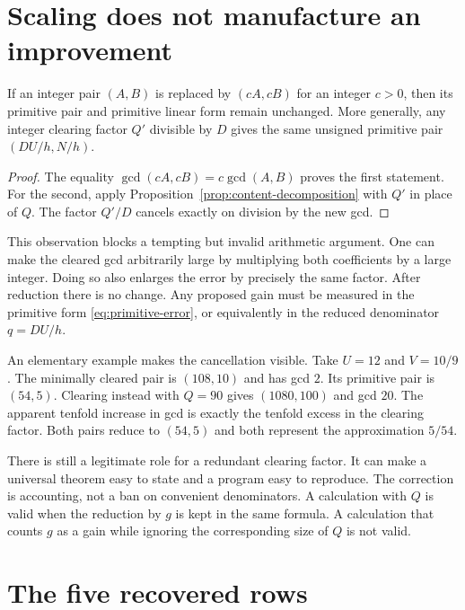 \section{Scaling does not manufacture an improvement}

\begin{proposition}
\label{prop:scale-invariance}
If an integer pair $(A,B)$ is replaced by $(cA,cB)$ for an integer $c>0$, then its primitive pair and primitive linear form remain unchanged. More generally, any integer clearing factor $Q'$ divisible by $D$ gives the same unsigned primitive pair $(DU/h,N/h)$.
\end{proposition}

\begin{proof}
The equality $\gcd(cA,cB)=c\gcd(A,B)$ proves the first statement. For the second, apply Proposition~\ref{prop:content-decomposition} with $Q'$ in place of $Q$. The factor $Q'/D$ cancels exactly on division by the new gcd.
\end{proof}

This observation blocks a tempting but invalid arithmetic argument. One can make the cleared gcd arbitrarily large by multiplying both coefficients by a large integer. Doing so also enlarges the error by precisely the same factor. After reduction there is no change. Any proposed gain must be measured in the primitive form \eqref{eq:primitive-error}, or equivalently in the reduced denominator $q=DU/h$.

An elementary example makes the cancellation visible. Take $U=12$ and $V=10/9$. The minimally cleared pair is $(108,10)$ and has gcd $2$. Its primitive pair is $(54,5)$. Clearing instead with $Q=90$ gives $(1080,100)$ and gcd $20$. The apparent tenfold increase in gcd is exactly the tenfold excess in the clearing factor. Both pairs reduce to $(54,5)$ and both represent the approximation $5/54$.

There is still a legitimate role for a redundant clearing factor. It can make a universal theorem easy to state and a program easy to reproduce. The correction is accounting, not a ban on convenient denominators. A calculation with $Q$ is valid when the reduction by $g$ is kept in the same formula. A calculation that counts $g$ as a gain while ignoring the corresponding size of $Q$ is not valid.

\section{The five recovered rows}

